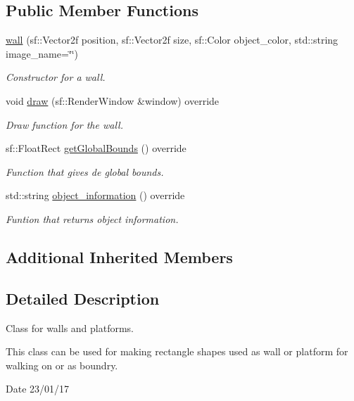 \subsection*{Public Member Functions}
\begin{DoxyCompactItemize}
\item 
\hyperlink{classwall_ac9c0db974e7839223fc4eb18c51dac62}{wall} (sf\+::\+Vector2f position, sf\+::\+Vector2f size, sf\+::\+Color object\+\_\+color, std\+::string image\+\_\+name=\char`\"{}\char`\"{})
\begin{DoxyCompactList}\small\item\em Constructor for a wall. \end{DoxyCompactList}\item 
void \hyperlink{classwall_aa25b8377e1d9a209fabd2271294f05d0}{draw} (sf\+::\+Render\+Window \&window) override
\begin{DoxyCompactList}\small\item\em Draw function for the wall. \end{DoxyCompactList}\item 
sf\+::\+Float\+Rect \hyperlink{classwall_a317a464c879cfdf9464bd6f1b62d9101}{get\+Global\+Bounds} () override
\begin{DoxyCompactList}\small\item\em Function that gives de global bounds. \end{DoxyCompactList}\item 
std\+::string \hyperlink{classwall_aab1de4f144f176b134a967ba08747932}{object\+\_\+information} () override
\begin{DoxyCompactList}\small\item\em Funtion that returns object information. \end{DoxyCompactList}\end{DoxyCompactItemize}
\subsection*{Additional Inherited Members}


\subsection{Detailed Description}
Class for walls and platforms. 

This class can be used for making rectangle shapes used as wall or platform for walking on or as boundry.

\begin{DoxyDate}{Date}
23/01/17 
\end{DoxyDate}


